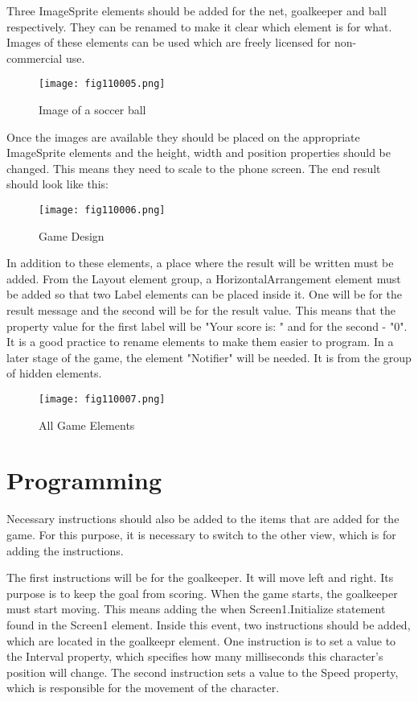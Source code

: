 Three ImageSprite elements should be added for the net, goalkeeper and ball respectively. They can be renamed to make it clear which element is for what. Images of these elements can be used which are freely licensed for non-commercial use.

\begin{figure}[H]
   \centering
   \texttt{[image: fig110005.png]}
   \caption{Image of a soccer ball}
\label{fig110005}
\end{figure}

Once the images are available they should be placed on the appropriate ImageSprite elements and the height, width and position properties should be changed. This means they need to scale to the phone screen. The end result should look like this:

\begin{figure}[H]
   \centering
   \texttt{[image: fig110006.png]}
   \caption{Game Design}
\label{fig110006}
\end{figure}

In addition to these elements, a place where the result will be written must be added. From the Layout element group, a HorizontalArrangement element must be added so that two Label elements can be placed inside it. One will be for the result message and the second will be for the result value. This means that the property value for the first label will be "Your score is: " and for the second - "0". It is a good practice to rename elements to make them easier to program. In a later stage of the game, the element "Notifier" will be needed. It is from the group of hidden elements.

\begin{figure}[H]
   \centering
   \texttt{[image: fig110007.png]}
   \caption{All Game Elements}
\label{fig110007}
\end{figure}

\section{Programming}
Necessary instructions should also be added to the items that are added for the game. For this purpose, it is necessary to switch to the other view, which is for adding the instructions.

The first instructions will be for the goalkeeper. It will move left and right. Its purpose is to keep the goal from scoring. When the game starts, the goalkeeper must start moving. This means adding the when Screen1.Initialize statement found in the Screen1 element. Inside this event, two instructions should be added, which are located in the goalkeepr element. One instruction is to set a value to the Interval property, which specifies how many milliseconds this character's position will change. The second instruction sets a value to the Speed property, which is responsible for the movement of the character.


